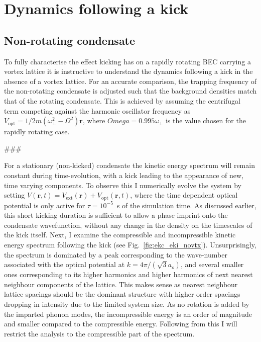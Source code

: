 \section{Dynamics following a kick}\label{sec:kickvl}
\subsection{Non-rotating condensate}
To fully characterise the effect kicking has on a rapidly rotating BEC carrying a vortex lattice it is instructive to understand the dynamics following a kick in the absence of a vortex lattice. For an accurate comparison, the trapping frequency of the non-rotating condensate is adjusted such that the background densities match that of the rotating condensate. This is achieved by assuming the centrifugal term competing against the harmonic oscillator frequency as $V_{\text{opt}} = 1/2m(\omega^2_\perp - \Omega^2)\mathbf
{r}$, where $Omega=0.995\omega_\perp$ is the value chosen for the rapidly rotating case.

###

For a stationary (non-kicked) condensate the kinetic energy spectrum will remain constant during time-evolution, with a kick leading to the appearance of new, time varying components. To observe this I numerically evolve the system by setting $V(\mathbf{r},t) = V_{\text{ext}}(\mathbf{r}) + V_{\text{opt}}(\mathbf{r},t)$, where the time dependent optical potential is only active for $\tau=10^{-5}$~s of the simulation time. As discussed earlier, this short kicking duration is sufficient to allow a phase imprint onto the condensate wavefunction, without any change in the density on the timescales of the kick itself. Next, I examine the compressible and incompressible kinetic energy spectrum following the kick (see Fig.~\ref{fig:ekc_eki_novtx}). Unsurprisingly, the spectrum is dominated by a peak corresponding to the wave-number associated with the optical potential at $k=4\pi/(\sqrt{3}a_o)$, and several smaller ones corresponding to its higher harmonics and higher harmonics of next nearest neighbour components of the lattice. This makes sense as nearest neighbour lattice spacings should be the dominant structure with higher order spacings dropping in intensity due to the limited system size. As no rotation is added by the imparted phonon modes, the incompressible energy is an order of magnitude and smaller compared to the compressible energy. Following from this I will restrict the analysis to the compressible part of the spectrum.

